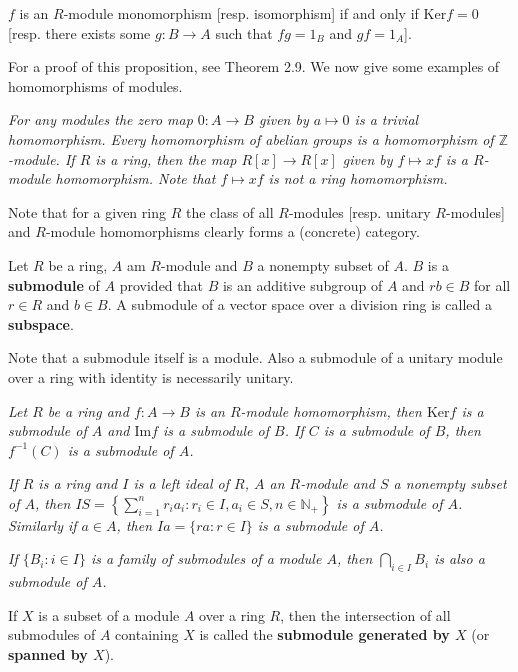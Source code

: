 \begin{proposition}
$f$ is an $R$-module monomorphism [resp. isomorphism] if and only if $\mathrm{Ker}f=0$ [resp. there exists some $g:B\to A$ such that $fg=1_B$ and $gf=1_A$].
\end{proposition}
For a proof of this proposition, see Theorem 2.9. We now give some examples of homomorphisms of modules.
\begin{example}\em
For any modules the zero map $0:A\to B$ given by $a\mapsto 0$ is a trivial homomorphism. Every homomorphism of abelian groups is a homomorphism of $\mathbb{Z}$-module. If $R$ is a ring, then the map $R[x]\to R[x]$ given by $f\mapsto xf$ is a $R$-module homomorphism. Note that $f\mapsto xf$ is not a ring homomorphism.
\end{example}
Note that for a given ring $R$ the class of all $R$-modules [resp. unitary $R$-modules] and $R$-module homomorphisms clearly forms a (concrete) category.
\begin{definition}
Let $R$ be a ring, $A$ am $R$-module and $B$ a nonempty subset of $A$. $B$ is a \textbf{submodule} of $A$ provided that $B$ is an additive subgroup of $A$ and $rb\in B$ for all $r\in R$ and $b\in B$. A submodule of a vector space over a division ring is called a \textbf{subspace}.
\end{definition}
Note that a submodule itself is a module. Also a submodule of a unitary module over a ring with identity is necessarily unitary.
\begin{example}\em
Let $R$ be a ring and $f:A\to B$ is an $R$-module homomorphism, then $\mathrm{Ker}f$ is a submodule of $A$ and $\mathrm{Im}f$ is a submodule of $B$. If $C$ is a submodule of $B$, then $f^{-1}(C)$ is a submodule of $A$.
\end{example}
\begin{example}\em
If $R$ is a ring and $I$ is a left ideal of $R$, $A$ an $R$-module and $S$ a nonempty subset of $A$, then $IS=\left\{\sum_{i=1}^nr_ia_i:r_i\in I,a_i\in S,n\in\mathbb{N}_+\right\}$ is a submodule of $A$. Similarly if $a\in A$, then $Ia=\{ra:r\in I\}$ is a submodule of $A$.
\end{example}
\begin{example}\em
If $\{B_i:i\in I\}$ is a family of submodules of a module $A$, then $\bigcap_{i\in I}B_i$ is also a submodule of $A$.
\end{example}
\begin{definition}
If $X$ is a subset of a module $A$ over a ring $R$, then the intersection of all submodules of $A$ containing $X$ is called the \textbf{submodule generated by $X$} (or \textbf{spanned by $X$}).
\end{definition}
